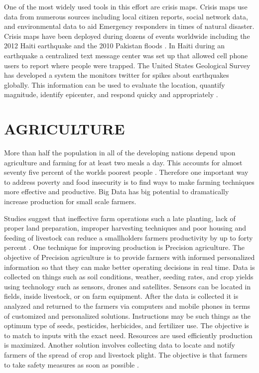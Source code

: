 \documentclass[sigconf]{acmart}
\begin{document}
One of the most widely used tools in this effort are crisis maps. Crisis maps use data from numerous sources including local citizen reports, social network data, and environmental data to aid Emergency responders in times of natural disaster. Crisis maps have been deployed during dozens of events worldwide including the 2012 Haiti earthquake and the 2010 Pakistan floods \cite{www-google-Hffpst}.
In Haiti during an earthquake a centralized text message center was set up that allowed cell phone users to report where people were trapped. The United States Geological Survey has developed a system the monitors twitter for spikes about earthquakes globally. This information can be used to evaluate the location, quantify magnitude, identify epicenter, and respond quicky and appropriately \cite{www-google-GloPls}.

\section{AGRICULTURE}

More than half the population in all of the developing nations depend upon agriculture and farming for at least two meals a day. This accounts for almost seventy five percent of the worlds poorest people \cite{www-google-top10}. Therefore one important way to address poverty and food insecurity is to find ways to make farming techniques more effective and productive. Big Data has big potential to dramatically increase production for small scale farmers.

Studies suggest that ineffective farm operations such a late planting, lack of proper land preparation, improper harvesting techniques and poor housing and feeding of livestock can reduce a smallholders farmers productivity by up to forty percent \cite{DevEcon}.
One technique for improving production is Precision agriculture. The objective of Precision agriculture is to provide farmers with informed personalized information so that they can make better operating decisions in real time. Data is collected on things such as soil conditions, weather, seeding rates, and crop yields using technology such as sensors, drones and satellites. Sensors can be located in fields, inside livestock, or on farm equipment.  After the data is collected it is analyzed and returned to the farmers via computers and mobile phones in terms of customized and personalized solutions. Instructions may be such things as the optimum type of seeds, pesticides, herbicides, and fertilizer use. The objective is to match to inputs with the exact need. Resources are used efficiently production is maximized. Another solution involves collecting data to locate and notify farmers of the spread of crop and livestock plight. The objective is that farmers to take safety measures as soon as possible \cite{www-google-Hffpst}.
\end{document}
